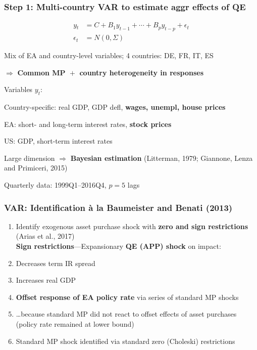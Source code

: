 \documentclass[pdflatex,aspectratio=169]{beamer}
\newcommand{\jemph}[1]{{\color{StataDarkBlue}#1}}
\newcommand{\jbemph}[1]{\textbf{\color{SlideNavy}#1}}
\begin{document}
\begin{frame}\frametitle{\bf\large Step 1: Multi-country VAR to estimate aggr effects of QE}

\vspace*{-11.5mm}
\begin{align*}
y{_t}&=C+B{_1}  y_{t-1}+\cdots+B{_p}  y_{t-p}+\epsilon_{t}\\
\epsilon_{t}&=N(0,\Sigma)
\end{align*}
\vspace*{-7.5mm}
\bi
\setlength{\itemsep}{2mm}
\item Mix of EA and country-level variables; \jemph{4 countries: DE, FR, IT, ES}
\item $\Rightarrow$ \jbemph{Common MP ${}+{}$ country heterogeneity in responses}
\item Variables $y_t$:
\bi
\item \jemph{Country-specific:} real GDP, GDP defl, \jbemph{wages, unempl, house prices}
\item \jemph{EA:} short- and long-term interest rates, \jbemph{stock prices}
\item \jemph{US:} GDP, short-term interest rates
\ei
\item Large dimension $\Rightarrow$ \jbemph{Bayesian estimation} (Litterman, 1979; Giannone, Lenza and Primiceri, 2015)
\item Quarterly data: 1999Q1--2016Q4, $p=5$ lags
\ei
\end{frame}



\begin{frame}\frametitle{\bf\large VAR: Identification \`a la Baumeister and Benati (2013)}
\begin{enumerate}
\setlength{\itemsep}{2mm}
\item Identify exogenous asset purchase shock with \jbemph{zero and sign restrictions} (Arias et al., 2017)\\[2mm]
\jbemph{Sign restrictions}---Expansionary \jbemph{QE (APP) shock} on impact:
\bi
\item Decreases term IR spread
\item Increases real GDP
\ei
\item \jbemph{Offset response of EA policy rate} via series of standard MP shocks
\bi
\item \dots because standard MP did not react to offset effects of asset purchases (policy rate remained at lower bound)
\ei
\item Standard MP shock identified via standard zero (Choleski) restrictions
\end{enumerate}

\end{frame}
\end{document}
